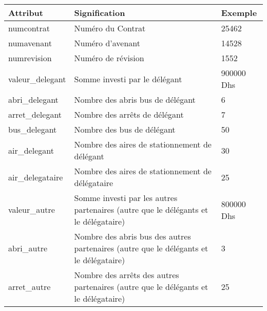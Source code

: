 	\begin{table}[H]
		\begin{center}
			\begin{tabularx}{17.5cm}{|p{2.5cm}|X|p{2.5cm}|}
				\hline
				\textbf{Attribut} & \textbf{Signification}                                                                              & \textbf{Exemple} \\
				\hline
				numcontrat        & Numéro du Contrat                                                                                   & 25462            \\
				\hline
				numavenant        & Numéro d'avenant                                                                                    & 14528            \\
				\hline
				numrevision       & Numéro de révision                                                                                  & 1552             \\
				\hline
				valeur\_delegant  & Somme investi par le délégant                                                                       & 900000 Dhs       \\
				\hline
				abri\_delegant    & Nombre des abris bus de délégant                                                                    & 6                \\
				\hline
				arret\_delegant   & Nombre des arrêts de délégant                                                                       & 7                \\
				\hline
				bus\_delegant     & Nombre des bus de délégant                                                                          & 50               \\
				\hline
				air\_delegant     & Nombre des aires de stationnement de délégant                                                       & 30               \\
				\hline
				air\_delegataire  & Nombre des aires de stationnement de délégataire                                                    & 25               \\
				\hline
				valeur\_autre     & Somme investi par les autres partenaires (autre que le délégants et le délégataire)                 & 800000 Dhs       \\
				\hline
				abri\_autre       & Nombre des abris bus des autres partenaires (autre que le délégants et le délégataire)              & 3                \\
				\hline
				arret\_autre      & Nombre des arrêts des autres partenaires (autre que le délégants et le délégataire)                 & 25               \\

\end{tabularx}
\end{center}
\end{table}
